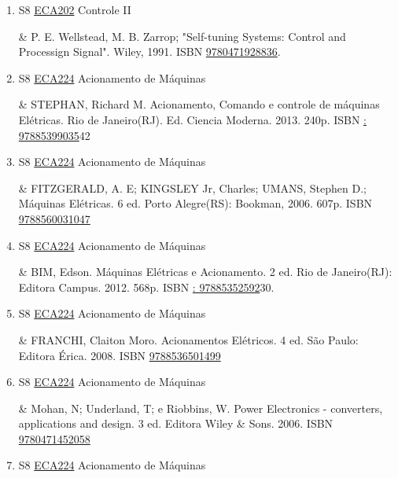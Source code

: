 \documentclass[12pt,a4paper]{book}
\begin{document}
\begin{enumerate}
 

 \item S8 \hyperref[PUD:ECA202]{ECA202} Controle II

&   P.  E.  Wellstead, M.  B.  Zarrop;  "Self-tuning Systems: Control and Processign Signal".  Wiley, 1991.  ISBN \href{http://www.isbnsearch.org/isbn/9780471928836}{9780471928836}.
 \item S8 \hyperref[PUD:ECA224]{ECA224} Acionamento de Máquinas

&  STEPHAN, Richard M.  Acionamento, Comando e controle de máquinas Elétricas.  Rio de Janeiro(RJ).  Ed.  Ciencia Moderna.  2013.  240p.  ISBN \href{http://www.google.com/search?hl=pt-BR&tbo=p&tbm=bks&q=isbn:: 97885399035&num=10}{: 97885399035}42
 

 \item S8 \hyperref[PUD:ECA224]{ECA224} Acionamento de Máquinas

& FITZGERALD, A. E;  KINGSLEY Jr, Charles;  UMANS, Stephen D.;  Máquinas Elétricas.  6 ed.  Porto Alegre(RS): Bookman, 2006.  607p.  ISBN \href{http://www.bn.br/site/pages/servicosProfissionais/agenciaISBN/isbnBusca/FbnBuscaISBNCatalogo.asp?pField=ISBN&pIntPagina=1&pISBN=60031047&nidbISBN=true&hidbISBN=true}{9788560031047}
 

 \item S8 \hyperref[PUD:ECA224]{ECA224} Acionamento de Máquinas

&  BIM, Edson.  Máquinas Elétricas e Acionamento.  2 ed.  Rio de Janeiro(RJ): Editora Campus.  2012.  568p.  ISBN \href{http://www.google.com/search?hl=pt-BR&tbo=p&tbm=bks&q=isbn:: 97885352592&num=10}{: 97885352592}30.
 \item S8 \hyperref[PUD:ECA224]{ECA224} Acionamento de Máquinas

& FRANCHI, Claiton Moro.  Acionamentos Elétricos.  4 ed.  São Paulo: Editora Érica.  2008.  ISBN \href{http://www.bn.br/site/pages/servicosProfissionais/agenciaISBN/isbnBusca/FbnBuscaISBNCatalogo.asp?pField=ISBN&pIntPagina=1&pISBN=36501499&nidbISBN=true&hidbISBN=true}{9788536501499}
 

 \item S8 \hyperref[PUD:ECA224]{ECA224} Acionamento de Máquinas

&   Mohan, N;  Underland, T;   e Riobbins, W.  Power Electronics - converters, applications and design.  3 ed.  Editora Wiley \& Sons.  2006.  ISBN \href{http://www.isbnsearch.org/isbn/9780471452058}{9780471452058}
 

 \item S8 \hyperref[PUD:ECA224]{ECA224} Acionamento de Máquinas


\end{enumerate}
\end{document}
